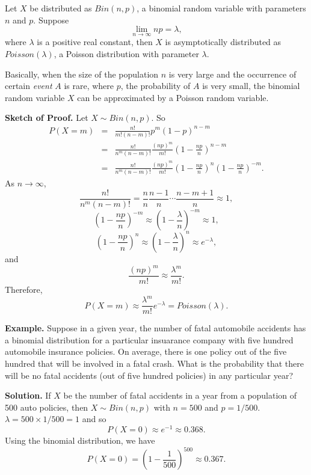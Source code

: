 \documentclass[12pt]{article}
\begin{document}
Let $X$ be distributed as $Bin(n,p)$, a binomial random variable with parameters $n$ and $p$.  Suppose $$\lim_{n\rightarrow\infty}np=\lambda,$$ where $\lambda$ is a positive real constant, then $X$ is asymptotically distributed as $Poisson(\lambda)$, a Poisson distribution with parameter $\lambda$.
\par
Basically, when the size of the population $n$ is very large and the occurrence of certain \emph{event} $A$ is rare, where $p$, the probability of $A$ is very small, the binomial random variable $X$ can be approximated by a Poisson random variable.
\par
\textbf{Sketch of Proof.}  Let $X\sim Bin(n,p)$.  So 
\begin{eqnarray*}
P(X=m) &=& \frac{n!}{m!(n-m)!}p^m(1-p)^{n-m} \\ 
&=& \frac{n!}{n^m(n-m)!}\frac{(np)^m}{m!}(1-\frac{np}{n})^{n-m} \\ 
&=& \frac{n!}{n^m(n-m)!}\frac{(np)^m}{m!}(1-\frac{np}{n})^n(1-\frac{np}{n})^{-m}.
\end{eqnarray*}
As $n\rightarrow\infty$, $$\frac{n!}{n^m(n-m)!}=\frac{n}{n}\frac{n-1}{n}\cdots\frac{n-m+1}{n}\approx 1,$$
$$(1-\frac{np}{n})^{-m}\approx (1-\frac{\lambda}{n})^{-m}\approx 1,$$
$$(1-\frac{np}{n})^n\approx (1-\frac{\lambda}{n})^n\approx e^{-\lambda},$$ and 
$$\frac{(np)^m}{m!}\approx \frac{\lambda^m}{m!}.$$  Therefore, 
$$P(X=m)\approx \frac{\lambda^m}{m!}e^{-\lambda} = Poisson(\lambda).$$
\par
\textbf{Example.}  Suppose in a given year, the number of fatal automobile accidents has a binomial distribution for a particular insuarance company with five hundred automobile insurance policies.  On average, there is one policy out of the five hundred that will be involved in a fatal crash.  What is the probability that there will be no fatal accidents (out of five hundred policies) in any particular year?
\par
\textbf{Solution.}  If $X$ be the number of fatal accidents in a year from a population of 500 auto policies, then $X\sim Bin(n,p)$ with $n=500$ and $p=1/500$.  $\lambda=500\times 1/500=1$ and so $$P(X=0)\approx e^{-1}\approx 0.368.$$  Using the binomial distribution, we have $$P(X=0)=(1-\frac{1}{500})^{500}\approx 0.367.$$
\end{document}
